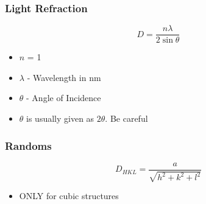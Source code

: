 		\subsubsection{Light Refraction}
			\begin{equation}
				D = \frac{n \lambda}{2 \sin \theta}
			\end{equation}
			\begin{itemize}[noitemsep]
				\item $n$ = 1
				\item $\lambda$ - Wavelength in \si{\nano \meter}
				\item $\theta$ - Angle of Incidence
				\item $\theta$ is usually given as $2 \theta$. Be careful
			\end{itemize}
	
		\subsubsection{Randoms}
			\begin{equation}
				D_{HKL} = \frac{a}{\sqrt{h^{2}+k^{2}+l^{2}}}
			\end{equation}
			\begin{itemize}[noitemsep]
				\item ONLY for cubic structures
			\end{itemize}